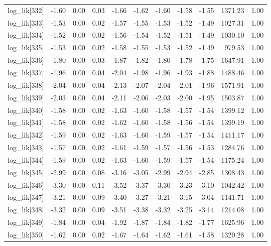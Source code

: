 \begin{table}[ht]
\begin{tabular}{rrrrrrrrrrr}
  log\_lik[332] & -1.60 & 0.00 & 0.03 & -1.66 & -1.62 & -1.60 & -1.58 & -1.55 & 1371.23 & 1.00 \\ 
  log\_lik[333] & -1.53 & 0.00 & 0.02 & -1.57 & -1.55 & -1.53 & -1.52 & -1.49 & 1027.31 & 1.00 \\ 
  log\_lik[334] & -1.52 & 0.00 & 0.02 & -1.56 & -1.54 & -1.52 & -1.51 & -1.49 & 1030.10 & 1.00 \\ 
  log\_lik[335] & -1.53 & 0.00 & 0.02 & -1.58 & -1.55 & -1.53 & -1.52 & -1.49 & 979.53 & 1.00 \\ 
  log\_lik[336] & -1.80 & 0.00 & 0.03 & -1.87 & -1.82 & -1.80 & -1.78 & -1.75 & 1647.91 & 1.00 \\ 
  log\_lik[337] & -1.96 & 0.00 & 0.04 & -2.04 & -1.98 & -1.96 & -1.93 & -1.88 & 1488.46 & 1.00 \\ 
  log\_lik[338] & -2.04 & 0.00 & 0.04 & -2.13 & -2.07 & -2.04 & -2.01 & -1.96 & 1571.91 & 1.00 \\ 
  log\_lik[339] & -2.03 & 0.00 & 0.04 & -2.11 & -2.06 & -2.03 & -2.00 & -1.95 & 1503.87 & 1.00 \\ 
  log\_lik[340] & -1.58 & 0.00 & 0.02 & -1.63 & -1.60 & -1.58 & -1.57 & -1.54 & 1399.12 & 1.00 \\ 
  log\_lik[341] & -1.58 & 0.00 & 0.02 & -1.62 & -1.60 & -1.58 & -1.56 & -1.54 & 1399.19 & 1.00 \\ 
  log\_lik[342] & -1.59 & 0.00 & 0.02 & -1.63 & -1.60 & -1.59 & -1.57 & -1.54 & 1411.17 & 1.00 \\ 
  log\_lik[343] & -1.57 & 0.00 & 0.02 & -1.61 & -1.59 & -1.57 & -1.56 & -1.53 & 1284.76 & 1.00 \\ 
  log\_lik[344] & -1.59 & 0.00 & 0.02 & -1.63 & -1.60 & -1.59 & -1.57 & -1.54 & 1175.24 & 1.00 \\ 
  log\_lik[345] & -2.99 & 0.00 & 0.08 & -3.16 & -3.05 & -2.99 & -2.94 & -2.85 & 1308.43 & 1.00 \\ 
  log\_lik[346] & -3.30 & 0.00 & 0.11 & -3.52 & -3.37 & -3.30 & -3.23 & -3.10 & 1042.42 & 1.00 \\ 
  log\_lik[347] & -3.21 & 0.00 & 0.09 & -3.40 & -3.27 & -3.21 & -3.15 & -3.04 & 1141.71 & 1.00 \\ 
  log\_lik[348] & -3.32 & 0.00 & 0.09 & -3.51 & -3.38 & -3.32 & -3.25 & -3.14 & 1214.08 & 1.00 \\ 
  log\_lik[349] & -1.84 & 0.00 & 0.04 & -1.92 & -1.87 & -1.84 & -1.82 & -1.77 & 1625.96 & 1.00 \\ 
  log\_lik[350] & -1.62 & 0.00 & 0.02 & -1.67 & -1.64 & -1.62 & -1.61 & -1.58 & 1320.28 & 1.00 \\ 

\end{tabular}
\end{table}
